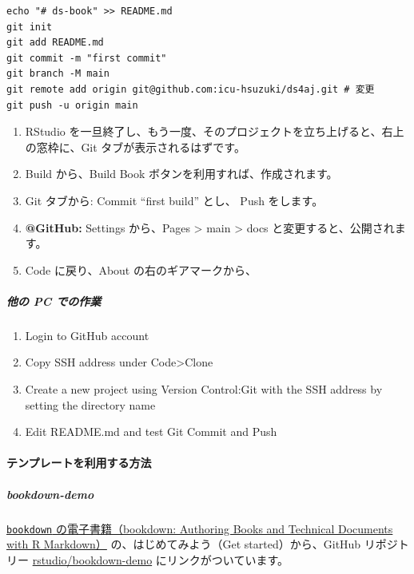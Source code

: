 \documentclass[
]{bxjsbook}
\providecommand{\tightlist}{%
  \setlength{\itemsep}{0pt}\setlength{\parskip}{0pt}}
\theoremstyle{definition}
\theoremstyle{definition}
\theoremstyle{definition}
\theoremstyle{definition}
\theoremstyle{remark}
\begin{document}
\begin{verbatim}
echo "# ds-book" >> README.md
git init
git add README.md
git commit -m "first commit"
git branch -M main
git remote add origin git@github.com:icu-hsuzuki/ds4aj.git # 変更
git push -u origin main
\end{verbatim}

\begin{enumerate}
\def\labelenumi{\arabic{enumi}.}
\setcounter{enumi}{4}
\tightlist
\item
  RStudio を一旦終了し、もう一度、そのプロジェクトを立ち上げると、右上の窓枠に、Git タブが表示されるはずです。
\item
  Build から、Build Book ボタンを利用すれば、作成されます。
\item
  Git タブから: Commit ``first build'' とし、 Push をします。
\item
  \textbf{@GitHub:} Settings から、Pages \textgreater{} main \textgreater{} docs と変更すると、公開されます。
\item
  Code に戻り、About の右のギアマークから、
\end{enumerate}

\hypertarget{ux4ed6ux306e-pc-ux3067ux306eux4f5cux696d}{%
\subparagraph{他の PC での作業}\label{ux4ed6ux306e-pc-ux3067ux306eux4f5cux696d}}

\begin{enumerate}
\def\labelenumi{\arabic{enumi}.}
\tightlist
\item
  Login to GitHub account
\item
  Copy SSH address under Code\textgreater Clone
\item
  Create a new project using Version Control:Git with the SSH address by setting the directory name
\item
  Edit README.md and test Git Commit and Push
\end{enumerate}

\hypertarget{ux30c6ux30f3ux30d7ux30ecux30fcux30c8ux3092ux5229ux7528ux3059ux308bux65b9ux6cd5}{%
\paragraph{テンプレートを利用する方法}\label{ux30c6ux30f3ux30d7ux30ecux30fcux30c8ux3092ux5229ux7528ux3059ux308bux65b9ux6cd5}}

\hypertarget{bookdown-demo}{%
\subparagraph{bookdown-demo}\label{bookdown-demo}}

\href{https://bookdown.org/yihui/bookdown/}{\texttt{bookdown} の電子書籍（bookdown: Authoring Books and Technical Documents with R Markdown）} の、はじめてみよう（Get started）から、GitHub リポジトリー \href{https://github.com/rstudio/bookdown-demo}{rstudio/bookdown-demo} にリンクがついています。
\end{document}
